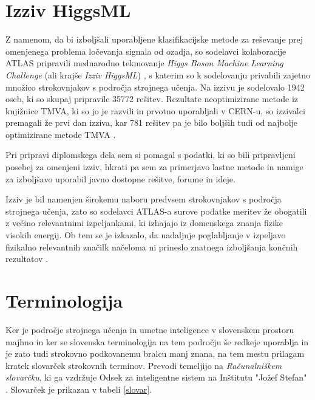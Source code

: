 \documentclass[11pt,a4paper,openany]{book}
\begin{document}
\section*{Izziv HiggsML}
Z namenom, da bi izboljšali uporabljene klasifikacijske metode za reševanje prej omenjenega problema ločevanja signala od ozadja, so sodelavci kolaboracije ATLAS pripravili mednarodno tekmovanje \textit{Higgs Boson Machine Learning Challenge} (ali krajše \textit{Izziv HiggsML}) \cite{HiggsMLChallenge}, s katerim so k sodelovanju privabili zajetno množico strokovnjakov s področja strojnega učenja. Na izzivu je sodelovalo 1942 oseb, ki so skupaj pripravile 35772 rešitev. Rezultate neoptimizirane metode iz knjižnice TMVA, ki so jo je razvili in prvotno uporabljali v CERN-u, so izzivalci premagali že prvi dan izziva, kar 781 rešitev pa je bilo boljših tudi od najbolje optimizirane metode TMVA \cite{Adam-Bourdarios14}.

Pri pripravi diplomskega dela sem si pomagal s podatki, ki so bili pripravljeni posebej za omenjeni izziv, hkrati pa sem za primerjavo lastne metode in namige za izboljšavo uporabil javno dostopne rešitve, forume in ideje.

Izziv je bil namenjen širokemu naboru predvsem strokovnjakov s področja strojnega učenja, zato so sodelavci ATLAS-a surove podatke meritev že obogatili z večino relevantnimi izpeljankami, ki izhajajo iz domenskega znanja fizike visokih energij. Ob tem se je izkazalo, da nadaljnje poglabljanje v izpeljavo fizikalno relevantnih značilk načeloma ni prineslo znatnega izboljšanja končnih rezultatov \cite{KaggleHPF}.


\section*{Terminologija}

Ker je področje strojnega učenja in umetne inteligence v slovenskem prostoru majhno in ker se slovenska terminologija na tem področju še redkeje uporablja in je zato tudi strokovno podkovanemu bralcu manj znana, na tem mestu prilagam kratek slovarček strokovnih terminov. Prevodi temeljijo na \textit{Računalniškem slovarčku}, ki ga vzdržuje Odsek za inteligentne sistem na Inštitutu "Jožef Stefan" \cite{DISSlovarcek}. Slovarček je prikazan v tabeli \ref{slovar}.



\end{document}
